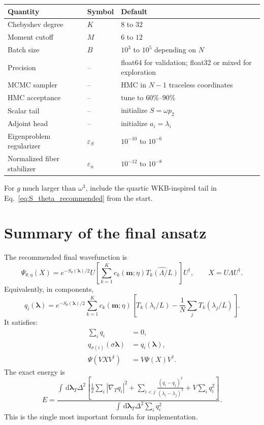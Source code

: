 \documentclass[11pt]{article}
\newcommand{\dd}{\,\mathrm d}
\newcommand{\gradT}{\nabla_{\!T}}
\newcommand{\eps}{\varepsilon}
\begin{document}
\begin{center}
\begin{tabular}{lll}
\toprule
Quantity & Symbol & Default \\
\midrule
Chebyshev degree & $K$ & $8$ to $32$ \\
Moment cutoff & $M$ & $6$ to $12$ \\
Batch size & $B$ & $10^3$ to $10^5$ depending on $N$ \\
Precision & -- & float64 for validation; float32 or mixed for exploration \\
MCMC sampler & -- & HMC in $N-1$ traceless coordinates \\
HMC acceptance & -- & tune to $60\%$--$90\%$ \\
Scalar tail & -- & initialize $S=\omega p_2$ \\
Adjoint head & -- & initialize $a_i=\lambda_i$ \\
Eigenproblem regularizer & $\eps_S$ & $10^{-10}$ to $10^{-6}$ \\
Normalized fiber stabilizer & $\eps_n$ & $10^{-12}$ to $10^{-8}$ \\
\bottomrule
\end{tabular}
\end{center}

For $g$ much larger than $\omega^3$, include the quartic WKB-inspired tail in Eq.~\eqref{eq:S_theta_recommended} from the start.

\section{Summary of the final ansatz}

The recommended final wavefunction is
\begin{equation}
\boxed{
\Psi_{\theta,\eta}(X)
=e^{-S_\theta(\bm\lambda)/2}
U\left[
\sum_{k=1}^Kc_k(\bm m;\eta)\widehat{T_k(\Lambda/L)}
\right]U^\dagger,
\qquad
X=U\Lambda U^\dagger.
}
\end{equation}
Equivalently, in components,
\begin{equation}
\boxed{
q_i(\bm\lambda)
=e^{-S_\theta(\bm\lambda)/2}
\sum_{k=1}^Kc_k(\bm m;\eta)
\left[T_k(\lambda_i/L)-\frac1N\sum_jT_k(\lambda_j/L)\right].
}
\end{equation}
It satisfies:
\begin{align}
\sum_iq_i&=0,\\
q_{\sigma(i)}(\sigma\bm\lambda)&=q_i(\bm\lambda),\\
\Psi(VXV^\dagger)&=V\Psi(X)V^\dagger.
\end{align}
The exact energy is
\begin{equation}
\boxed{
E=\frac{
\int\dd\bm\lambda_T\Delta^2
\left[\frac12\sum_i|\gradT q_i|^2
+\sum_{i<j}\frac{(q_i-q_j)^2}{(\lambda_i-\lambda_j)^2}
+V\sum_iq_i^2\right]
}{
\int\dd\bm\lambda_T\Delta^2\sum_iq_i^2
}.
}
\end{equation}
This is the single most important formula for implementation.
\end{document}
